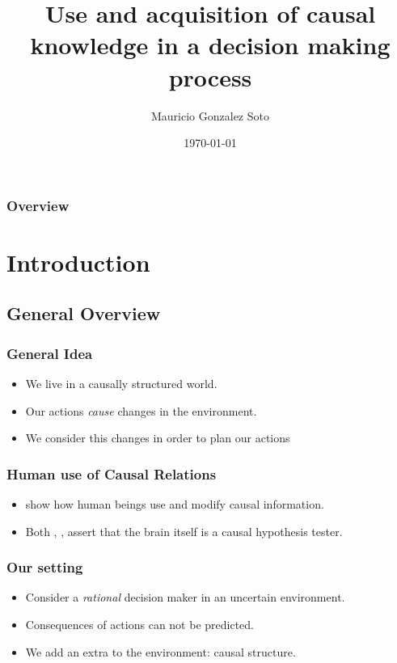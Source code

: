 \documentclass{beamer}
\title[Short title]{Use and acquisition of causal knowledge in a decision making process} %
\author{Mauricio Gonzalez Soto} %
\institute[INAOE] %
{
Instituto Nacional de Astrofísica Óptica y Electrónica \\ %
\medskip
\textit{mauricio@inaoep.mx} %
}
\date{\today} %
\theoremstyle{plain}
\begin{document}
\begin{frame}
\titlepage %
\end{frame}

\begin{frame}[allowframebreaks]
\frametitle{Overview} %
\tableofcontents %
\end{frame}


\section{Introduction}
\subsection{General Overview}
\begin{frame}
\frametitle{General Idea}
\begin{itemize}
\item We live in a causally structured world. 
\item Our actions \textit{cause} changes in the environment.
\item We consider this changes in order to plan our actions
\end{itemize}
\end{frame}


\begin{frame}
\frametitle{Human use of Causal Relations}
\begin{itemize}
\item \cite{hagmayer2013repeated} show how human beings use and modify causal information.
\item Both \cite{hohwy2013predictive}, \cite{clark2015surfing}, assert that the brain itself is a causal hypothesis tester. 
\end{itemize}
\end{frame}

\begin{frame}
\frametitle{Our setting}
\begin{itemize}
\item Consider a \textit{rational} decision maker in an uncertain environment.
\item Consequences of actions can not be predicted.
\item We add an extra to the environment: causal structure. 
\end{itemize}
\end{frame}
\end{document}
